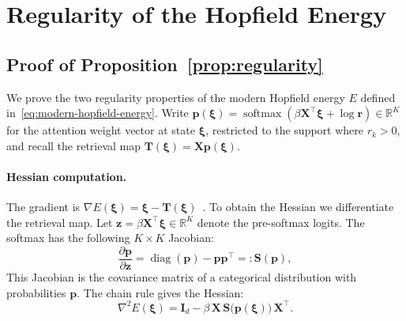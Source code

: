 
\section{Regularity of the Hopfield Energy}
\subsection{Proof of Proposition~\ref{prop:regularity}}\label{app:proof-regularity}

We prove the two regularity properties of the modern Hopfield energy $E$ defined in~\eqref{eq:modern-hopfield-energy}. Write $\mathbf{p}(\boldsymbol{\xi})=\operatorname{softmax}(\beta\mathbf{X}^{\top}\boldsymbol{\xi}+\log\mathbf r)\in\mathbb{R}^K$ for the attention weight vector at state $\boldsymbol{\xi}$, restricted to the support where $r_k>0$, and recall the retrieval map $\mathbf{T}(\boldsymbol{\xi})=\mathbf{X}\mathbf{p}(\boldsymbol{\xi})$.

\paragraph{Hessian computation.}
The gradient is $\nabla E(\boldsymbol{\xi})=\boldsymbol{\xi}-\mathbf{T}(\boldsymbol{\xi})$~\cite{ramsauerHopfieldNetworksAll2021}. To obtain the Hessian we differentiate the retrieval map. Let $\mathbf{z}=\beta\mathbf{X}^{\top}\boldsymbol{\xi}\in\mathbb{R}^K$ denote the pre-softmax logits. The softmax has the following $K\times K$ Jacobian:
\begin{equation}\label{eq:softmax-jacobian}
    \frac{\partial\mathbf{p}}{\partial\mathbf{z}}
    = \operatorname{diag}(\mathbf{p}) - \mathbf{p}\mathbf{p}^{\top}
    =: \mathbf{S}(\mathbf{p}),
\end{equation}
This Jacobian is the covariance matrix of a categorical distribution with
probabilities $\mathbf p$. The chain rule gives the Hessian:
\begin{equation}\label{eq:hessian}
    \nabla^{2}E(\boldsymbol{\xi})
    = \mathbf{I}_{d} - \beta\,\mathbf{X}\,\mathbf{S}\bigl(\mathbf{p}(\boldsymbol{\xi})\bigr)\,\mathbf{X}^{\top}.
\end{equation}

